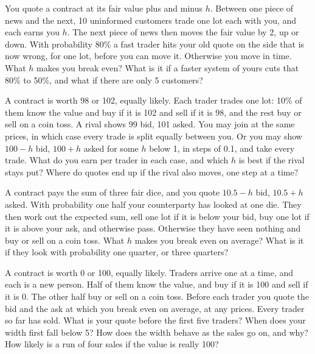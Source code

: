 \begin{question}\label{iq:iv2:making-a-market:20}
You quote a contract at its fair value plus and minus $h$. Between one piece of news and the next, 10 uninformed customers trade one lot each with you, and each earns you $h$. The next piece of news then moves the fair value by 2, up or down. With probability 80\% a fast trader hits your old quote on the side that is now wrong, for one lot, before you can move it. Otherwise you move in time. What $h$ makes you break even? What is it if a faster system of yours cuts that 80\% to 50\%, and what if there are only 5 customers?
\end{question}

\begin{question}\label{iq:iv2:making-a-market:21}
A contract is worth 98 or 102, equally likely. Each trader trades one lot: 10\% of them know the value and buy if it is 102 and sell if it is 98, and the rest buy or sell on a coin toss. A rival shows 99 bid, 101 asked. You may join at the same prices, in which case every trade is split equally between you. Or you may show $100 - h$ bid, $100 + h$ asked for some $h$ below 1, in steps of 0.1, and take every trade. What do you earn per trader in each case, and which $h$ is best if the rival stays put? Where do quotes end up if the rival also moves, one step at a time?
\end{question}

\begin{question}\label{iq:iv2:making-a-market:22}
A contract pays the sum of three fair dice, and you quote $10.5 - h$ bid, $10.5 + h$ asked. With probability one half your counterparty has looked at one die. They then work out the expected sum, sell one lot if it is below your bid, buy one lot if it is above your ask, and otherwise pass. Otherwise they have seen nothing and buy or sell on a coin toss. What $h$ makes you break even on average? What is it if they look with probability one quarter, or three quarters?
\end{question}

\begin{question}\label{iq:iv2:making-a-market:23}
A contract is worth 0 or 100, equally likely. Traders arrive one at a time, and each is a new person. Half of them know the value, and buy if it is 100 and sell if it is 0. The other half buy or sell on a coin toss. Before each trader you quote the bid and the ask at which you break even on average, at any prices. Every trader so far has sold. What is your quote before the first five traders? When does your width first fall below 5? How does the width behave as the sales go on, and why? How likely is a run of four sales if the value is really 100?
\end{question}

